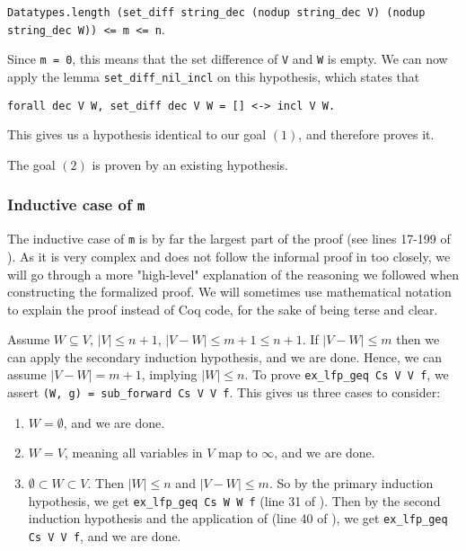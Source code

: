 \tabto{2em}
\lstinline{Datatypes.length (set_diff string_dec (nodup string_dec V) (nodup string_dec W)) <= m <= n}.

Since \lstinline{m = 0}, this means that
the set difference of \lstinline{V} and \lstinline{W} is empty.
We can now apply the lemma \lstinline{set_diff_nil_incl} on this hypothesis, which states that

\tabto{2em}
\lstinline{forall dec V W, set_diff dec V W = [] <-> incl V W.}

This gives us a hypothesis identical to our goal $(1)$, and therefore proves it.

The goal $(2)$ is proven by an existing hypothesis.

\subsubsection{Inductive case of \lstinline{m}}
\label{sssec:inductive_case_m}

The inductive case of \lstinline{m} is by far the largest part of the proof (see lines 17-199 of ).
As it is very complex and does not follow the informal proof in \cite{mbezem} too closely,
we will go through a more "high-level" explanation of the reasoning
we followed when constructing the formalized proof.
We will sometimes use mathematical notation to explain the proof instead of Coq code,
for the sake of being terse and clear.

Assume $W \subseteq V$, $\lvert V \rvert \leq n + 1$, $\lvert V - W \rvert \leq m + 1 \leq n + 1$.
If $\lvert V - W \rvert \leq m$ then we can apply the secondary induction hypothesis, and we are done.
Hence, we can assume $\lvert V - W \rvert = m + 1$, implying $\lvert W \rvert \leq n$.
To prove \lstinline{ex_lfp_geq Cs V V f}, we assert \lstinline{(W, g) = sub_forward Cs V V f}.
This gives us three cases to consider:

\begin{enumerate}
  \item $W = \emptyset$, and we are done.
  \item $W = V$, meaning all variables in $V$ map to $\infty$, and we are done.
  \item $\emptyset \subset W \subset V$. Then $\lvert W \rvert \leq n$ and $\lvert V - W \rvert \leq m$.
      So by the primary induction hypothesis, we get \lstinline{ex_lfp_geq Cs W W f}
      (line 31 of ).
      Then by the second induction hypothesis and the application of  (line 40 of ),
      we get \lstinline{ex_lfp_geq Cs V V f}, and we are done.
\end{enumerate}

